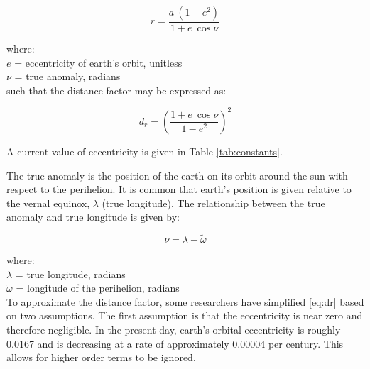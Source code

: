 %
\begin{equation}
\label{eq:r}
    r = \frac{a \: \left(1 - e^2\right)}{1+e \: \cos \nu}
\end{equation}

\noindent where: \\
\indent $e$ = eccentricity of earth's orbit, unitless \\
\indent $\nu$ = true anomaly, radians \\

\noindent such that the distance factor may be expressed as:

\begin{equation}
\label{eq:dr_exp}
    d_{r} = \left(\frac{1 + e\: \cos\nu}{1 - e^2}\right)^{2}
\end{equation}

\noindent A current value of eccentricity is given in Table \ref{tab:constants}.

The true anomaly is the position of the earth on its orbit around the sun with respect to the perihelion. 
It is common that earth's position is given relative to the vernal equinox, $\lambda$ (true longitude). 
The relationship between the true anomaly and true longitude is given by:

\begin{equation}
\label{eq:nu}
    \nu = \lambda - \tilde{\omega}
\end{equation}

\noindent where: \\
\indent $\lambda$ = true longitude, radians \\
\indent $\tilde{\omega}$ = longitude of the perihelion, radians\\

To approximate the distance factor, some researchers have simplified \ref{eq:dr} based on two assumptions. 
The first assumption is that the eccentricity is near zero and therefore negligible. 
In the present day, earth's orbital eccentricity is roughly 0.0167 and is decreasing at a rate of approximately 0.00004 per century\footnotemark {}. 
This allows for higher order terms to be ignored. 

